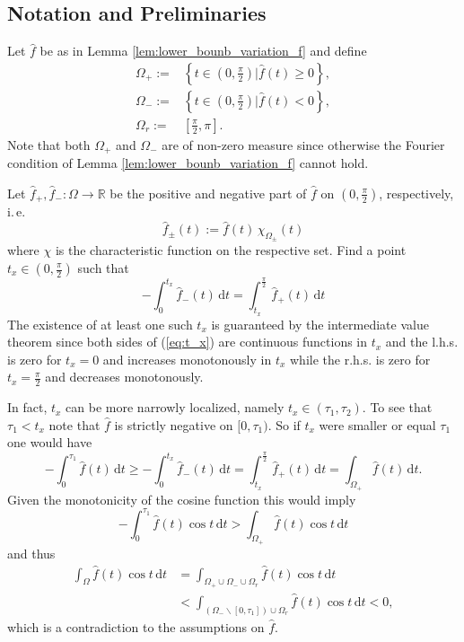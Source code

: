 \documentclass{article}
\newcommand{\ite}{i.\,e.\xspace}
\newcommand{\dt}{\,\mathrm{d}t}
\newcommand{\R}{\mathbb{R}\xspace}
\begin{document}
\subsection{Notation and Preliminaries}
Let $\hat f$ be as in Lemma \ref{lem:lower_bounb_variation_f} and define
\begin{align*}
    \Omega_+ :=& \left\{t\in\left(0,\frac\pi 2\right)| \hat f(t) \ge 0\right\},\\
    \Omega_- :=& \left\{t\in\left(0,\frac\pi 2\right)| \hat f(t) < 0\right\},\\
    \Omega_r :=& \left[\frac{\pi}{2}, \pi\right].
\end{align*}
Note that both $\Omega_+$ and $\Omega_-$ are of non-zero measure since otherwise the Fourier condition of Lemma \ref{lem:lower_bounb_variation_f} cannot hold.

Let $\hat f_+, \hat f_-: \Omega \rightarrow \R$ be the positive and negative part of $\hat f$ on $(0,\frac\pi2)$, respectively, \ite 
\begin{equation*}
    \hat f_\pm(t) := \hat f(t)\, \chi_{\Omega_\pm}(t)
\end{equation*}
where $\chi$ is the characteristic function on the respective set. Find a point $t_x \in (0,\frac{\pi}{2})$ such that
\begin{equation} \label{eq:t_x}
    -\int_0^{t_x} \hat f_-(t) \dt = \int_{t_x}^{\frac\pi2} \hat f_+(t) \dt
\end{equation}
The existence of at least one such $t_x$ is guaranteed by the intermediate value theorem since both sides of (\ref{eq:t_x}) are continuous functions in $t_x$ and the l.h.s. is zero for $t_x = 0$ and increases mono\-tonously in $t_x$ while the r.h.s. is zero for $t_x = \frac{\pi}{2}$ and decreases mono\-tonously.

In fact, $t_x$ can be more narrowly localized, namely $t_x \in (\tau_1,\tau_2)$.
To see that $\tau_1<t_x$ note that $\hat f$ is strictly negative on $[0, \tau_1)$. So if $t_x$ were smaller or equal $\tau_1$ one would have
\begin{equation*}
    -\int_0^{\tau_1} \hat f(t) \dt \ge -\int_0^{t_x} \hat f_-(t) \dt = \int_{t_x}^{\frac\pi2} \hat f_+(t) \dt = \int_{\Omega_+} \hat f(t) \dt.
\end{equation*} 
Given the monotonicity of the cosine function this would imply
\begin{equation*}
    -\int_0^{\tau_1} \hat f(t) \cos t \dt > \int_{\Omega_+} \hat f(t) \cos t \dt
\end{equation*}
and thus
\begin{align*}
    \int_\Omega \hat f(t) \cos t \dt &= \int_{\Omega_+\cup\Omega_-\cup\Omega_r} \hat f(t) \cos t \dt\\
    &< \int_{(\Omega_- \backslash[0,\tau_1])\cup\Omega_r} \hat f(t) \cos t \dt <  0,    
\end{align*}
which is a contradiction to the assumptions on $\hat f$.
\end{document}
